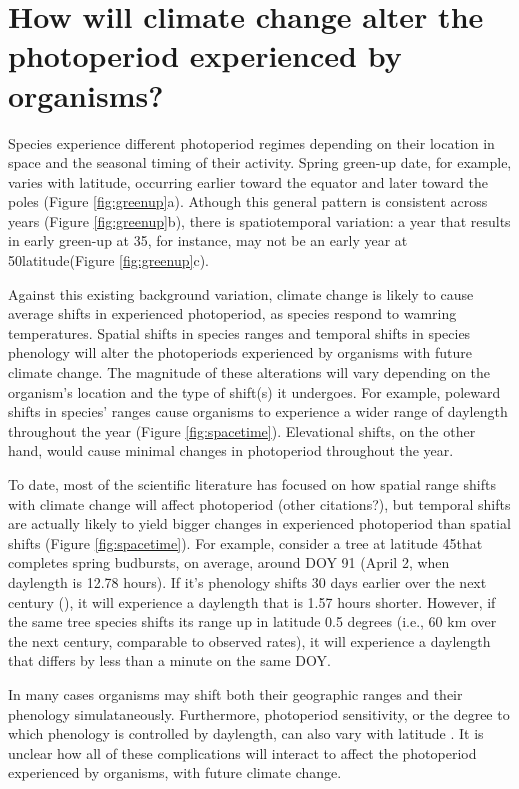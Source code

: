 \documentclass{article}
\begin{document}
\section*{How will climate change alter the photoperiod experienced by organisms?}
\par Species experience different photoperiod regimes depending on their location in space and the seasonal timing of their activity. Spring green-up date, for example, varies with latitude, occurring earlier toward the equator and later toward the poles (Figure \ref{fig:greenup}a). Athough this general pattern is consistent across years (Figure \ref{fig:greenup}b), there is spatiotemporal variation: a year that results in early green-up at 35\degree, for instance, may not be an early year at 50\degree latitude(Figure \ref{fig:greenup}c).
\par Against this existing background variation, climate change is likely to cause average shifts in experienced photoperiod, as species respond to wamring temperatures. Spatial shifts in species ranges and temporal shifts in species phenology will alter the photoperiods experienced by organisms with future climate change. The magnitude of these alterations will vary depending on the organism's location and the type of shift(s) it undergoes. For example, poleward shifts in species' ranges cause organisms to experience a wider range of daylength throughout the year (Figure \ref{fig:spacetime}). Elevational shifts, on the other hand, would cause minimal changes in photoperiod throughout the year. 
\par To date, most of the scientific literature has focused on how spatial range shifts with climate change will affect photoperiod \citep{saikkonen2012} (other citations?), but temporal shifts are actually likely to yield bigger changes in experienced photoperiod than spatial shifts (Figure \ref{fig:spacetime}). For example, consider a tree at latitude 45\degree that completes spring budbursts, on average, around DOY 91 (April 2, when daylength is 12.78 hours). If it's phenology shifts 30 days earlier over the next century (\citep[][i.e., a rate of ~3 days per decade, as has been observed]{parmesan2003}), it will experience a daylength that is 1.57 hours shorter. However, if the same tree species shifts its range up in latitude 0.5 degrees (i.e., 60 km over the next century,  comparable to observed rates\citep{parmesan2003, chen2011}), it will experience a daylength that differs by less than a minute on the same DOY. 

\par In many cases organisms may shift both their geographic ranges and their phenology simulataneously. Furthermore, photoperiod sensitivity, or the degree to which phenology is controlled by daylength, can also vary with latitude \citep{Howe:1996,saikkonen2012,Partanen:2005aa,Vihera-Aarnio:2006aa,Caffarra:2011b,gauzere2017}. It is unclear how all of these complications will interact to affect the photoperiod experienced by organisms, with future climate change.
\end{document}
